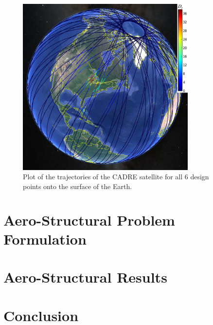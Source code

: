 \documentclass[]{aiaa-tc} %
\begin{document}
\begin{figure}
\centering
\includegraphics[width=0.8\textwidth]{images/allpts_gearth2.png}
\caption[width=0.4\textwidth]{Plot of the trajectories of the CADRE satellite
for all 6 design points onto the surface of the Earth.}
\label{allpt_g_earth}
\end{figure}


  \section{Aero-Structural Problem Formulation}

  \section{Aero-Structural Results}

  \section{Conclusion}

  
\end{document}
